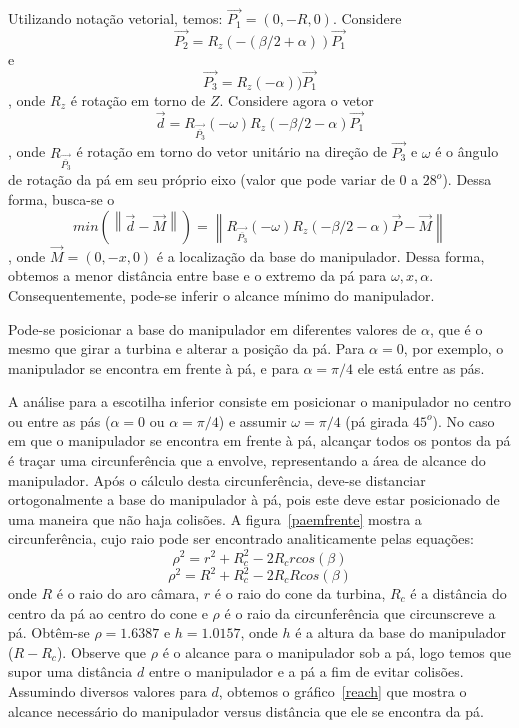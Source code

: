 Utilizando notação vetorial, temos: $\overrightarrow{P_1} = (0,-R,0)$. Considere
$$\overrightarrow{{P_2}} = R_z(-(\beta/2 + \alpha))
\overrightarrow{P_1}$$ e $$\overrightarrow{{P_3}} = R_z(-\alpha))
\overrightarrow{P_1}$$ , onde $R_z$ é rotação em  torno de $Z$. Considere agora
o vetor $$\overrightarrow{d} =
R_{\overrightarrow{\overline{P_3}}}(-\omega)R_z(-\beta/2 -
\alpha)\overrightarrow{P_1}$$, onde $R_{\overrightarrow{\overline{P_3}}}$ é rotação em torno do vetor unitário
na direção de $\overrightarrow{P_3}$ e $\omega$ é o ângulo de rotação da pá em
seu próprio eixo (valor que pode variar de $0$ a $28^o$).
Dessa forma, busca-se o $$min (\left \| \overrightarrow{d} - \overrightarrow{M} 
\right \|) =\left \| R_{\overrightarrow{\overline{P_3}}}(-\omega)R_z(-\beta/2 -
\alpha)\overrightarrow{P} - \overrightarrow{M} \right \|$$, onde
$\overrightarrow{M}=(0,-x,0)$ é a localização da base do manipulador. Dessa
forma, obtemos a menor distância entre base e o extremo da pá para $\omega,
x, \alpha$. Consequentemente, pode-se inferir o alcance mínimo do manipulador.

Pode-se posicionar a base do manipulador em diferentes valores de $\alpha$, que é
o mesmo que girar a turbina e alterar a posição da pá. Para $\alpha = 0$, por
exemplo, o manipulador se encontra em frente à pá, e para $\alpha = \pi/4$ ele está entre as pás.

A análise para a escotilha inferior consiste em posicionar o manipulador no
centro ou entre as pás ($\alpha = 0$ ou $\alpha = \pi/4$) e assumir $\omega =
\pi/4$ (pá girada $45^o$). No caso em que o
manipulador se encontra em frente à pá, alcançar todos os pontos da pá  é
traçar uma circunferência que a envolve, representando
a área de alcance do manipulador. Após o cálculo desta
circunferência, deve-se distanciar ortogonalmente a base do manipulador à pá,
pois este deve estar posicionado de uma maneira que não haja colisões. A
figura~\ref{paemfrente} mostra a circunferência, cujo raio pode ser encontrado
analiticamente pelas equações:
$$\rho ^2 = r^2+R_c^2-2R_crcos(\beta)$$
$$\rho ^2 = R^2+R_c^2-2R_cRcos(\beta)$$
onde $R$ é o raio do aro câmara, $r$ é o raio do cone da turbina, $R_c$ é a
distância do centro da pá ao centro do cone e $\rho$ é o raio da circunferência
que circunscreve a pá. Obtêm-se  $\rho=1.6387$ e $h=1.0157$, onde $h$ é a altura
da base do manipulador ($R-R_c$). Observe que $\rho$ é o alcance para o
manipulador sob a pá, logo temos que supor uma distância $d$ entre o manipulador
e a pá a fim de evitar colisões. Assumindo diversos valores para $d$, obtemos o
gráfico~\ref{reach} que mostra o alcance necessário do manipulador versus
distância que ele se encontra da pá. 

